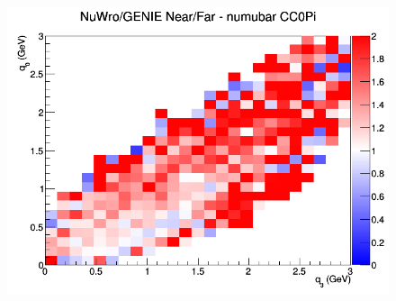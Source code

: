 \documentclass[12pt]{article}
\begin{document}
\begin{figure}[h]
\endminipage
{}
\includegraphics[width=\linewidth]{eff_q0_q3/FGT/ratios/CC0Pi_NuWro_GENIE_numubar_NF_q3_q0.png}
\endminipage
\newline
\end{figure}
\clearpage
\end{document}

